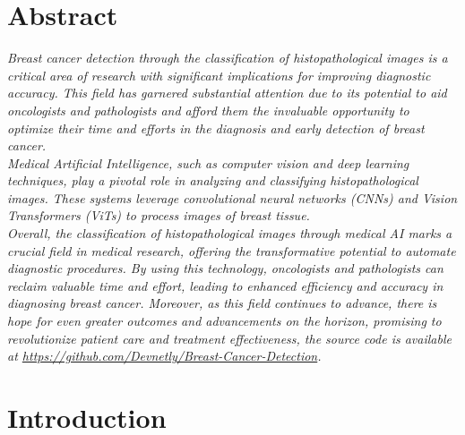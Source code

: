 \documentclass[
11pt, %
english, %
singlespacing, %
headsepline, %
]{project_structure}
\begin{document}
{
\hypersetup{linkcolor=black}
\listoftables
}

\printglossaries

\newpage
\section*{Abstract}
\textit{Breast cancer detection through the classification of histopathological images is a critical area of research with significant implications for improving diagnostic accuracy. This field has garnered substantial attention due to its potential to aid oncologists and pathologists and afford them the invaluable opportunity to optimize their time and efforts in the diagnosis and early detection of breast cancer.}\\

\noindent \textit{Medical Artificial Intelligence, such as computer vision and deep learning techniques, play a pivotal role in analyzing and classifying histopathological images. These systems leverage convolutional neural networks (\acrshort{CNN}s) and Vision Transformers (\acrshort{ViT}s) to process images of breast tissue.}\\

\noindent \textit{Overall, the classification of histopathological images through medical AI marks a crucial field in medical research, offering the transformative potential to automate diagnostic procedures. By using this technology, oncologists and pathologists can reclaim valuable time and effort, leading to enhanced efficiency and accuracy in diagnosing breast cancer. Moreover, as this field continues to advance, there is hope for even greater outcomes and advancements on the horizon, promising to revolutionize patient care and treatment effectiveness, the source code is available at \href{https://github.com/Devnetly/Breast-Cancer-Detection}{https://github.com/Devnetly/Breast-Cancer-Detection}.}

\section{Introduction}
\end{document}
